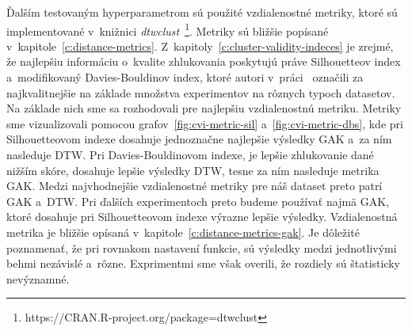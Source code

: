 \documentclass[a4paper,twoside,slovak,12pt,appendix]{article}
\begin{document}
Ďalším testovaným hyperparametrom sú použité vzdialenostné metriky, ktoré sú
implementované v~knižnici
\textit{dtwclust}~\footnote{https://CRAN.R-project.org/package=dtwclust}.
Metriky sú bližšie popísané v~kapitole~\ref{c:distance-metrics}.
Z~kapitoly~\ref{c:cluster-validity-indeces} je zrejmé, že najlepšiu informáciu
o~kvalite zhlukovania poskytujú práve Silhouetteov index
a~modifikovaný Davies-Bouldinov index, ktoré autori v~práci~\cite{Arbelaitz2013}
označili za najkvalitnejšie na základe množstva experimentov na rôznych typoch
datasetov. Na základe nich sme sa rozhodovali pre najlepšiu vzdialenostnú
metriku. Metriky sme vizualizovali pomocou grafov~\ref{fig:cvi-metric-sil}
a~\ref{fig:cvi-metric-dbs}, kde pri Silhouetteovom indexe dosahuje jednoznačne
najlepšie výsledky GAK a~za ním nasleduje DTW. Pri Davies-Bouldinovom indexe, je
lepšie zhlukovanie dané nižším skóre, dosahuje lepšie výsledky DTW, tesne za ním
nasleduje metrika GAK. Medzi najvhodnejšie vzdialenostné metriky pre náš dataset
preto patrí GAK a~DTW. Pri ďalších experimentoch preto budeme používať najmä
GAK, ktoré dosahuje pri Silhouetteovom indexe výrazne lepšie výsledky.
Vzdialenostná metrika je bližšie opísaná
v~kapitole~\ref{c:distance-metrics-gak}. Je dôležité poznamenať, že pri rovnakom
nastavení funkcie, sú výsledky medzi jednotlivými behmi nezávislé a~rôzne.
Exprimentmi sme však overili, že rozdiely sú štatisticky nevýznamné.
\end{document}
